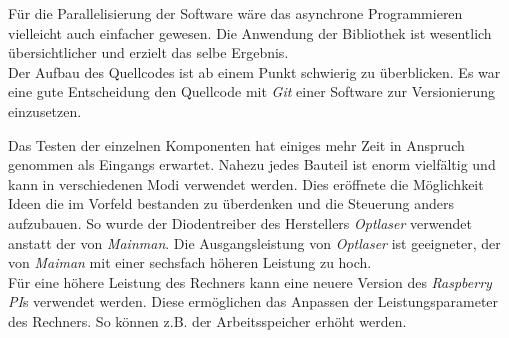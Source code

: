 Für die Parallelisierung der Software wäre das asynchrone Programmieren vielleicht auch einfacher gewesen. Die Anwendung der Bibliothek ist wesentlich übersichtlicher und erzielt das selbe Ergebnis.\\

Der Aufbau des Quellcodes ist ab einem Punkt schwierig zu überblicken. Es war eine gute Entscheidung den Quellcode mit \textit{Git} einer Software zur Versionierung einzusetzen. 

Das Testen der einzelnen Komponenten hat einiges mehr Zeit in Anspruch genommen als Eingangs erwartet. Nahezu jedes Bauteil ist enorm vielfältig und kann in verschiedenen Modi verwendet werden. Dies eröffnete die Möglichkeit Ideen die im Vorfeld bestanden zu überdenken und die Steuerung anders aufzubauen. So wurde der Diodentreiber des Herstellers \textit{Optlaser} verwendet anstatt der von \textit{Mainman}. Die Ausgangsleistung von \textit{Optlaser} ist geeigneter, der von \textit{Maiman} mit einer sechsfach höheren Leistung zu hoch.\\
Für eine höhere Leistung des Rechners kann eine neuere Version des \textit{Raspberry PI}s verwendet werden. Diese ermöglichen das Anpassen der Leistungsparameter des Rechners. So können z.B. der Arbeitsspeicher erhöht werden.